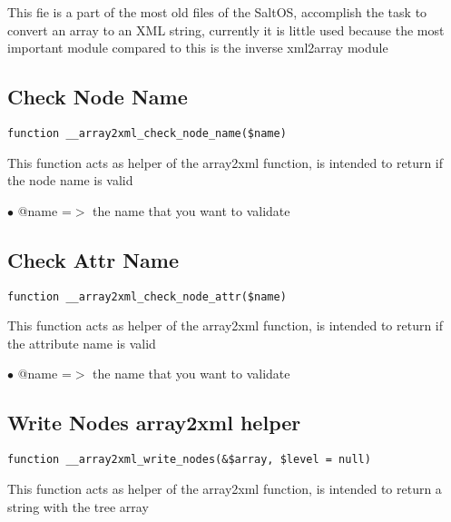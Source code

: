 \documentclass[a4paper]{book}
\begin{document}
This fie is a part of the most old files of the SaltOS, accomplish the task to convert an array
to an XML string, currently it is little used because the most important module compared to this
is the inverse xml2array module

\hypertarget{toc38}{}
\subsection{Check Node Name}

\begin{lstlisting}
function __array2xml_check_node_name($name)
\end{lstlisting}

This function acts as helper of the array2xml function, is intended to
return if the node name is valid

\begin{compactitem}
\item[\color{myblue}$\bullet$] @name =$>$ the name that you want to validate
\end{compactitem}

\hypertarget{toc39}{}
\subsection{Check Attr Name}

\begin{lstlisting}
function __array2xml_check_node_attr($name)
\end{lstlisting}

This function acts as helper of the array2xml function, is intended to
return if the attribute name is valid

\begin{compactitem}
\item[\color{myblue}$\bullet$] @name =$>$ the name that you want to validate
\end{compactitem}

\hypertarget{toc40}{}
\subsection{Write Nodes array2xml helper}

\begin{lstlisting}
function __array2xml_write_nodes(&$array, $level = null)
\end{lstlisting}

This function acts as helper of the array2xml function, is intended to
return a string with the tree array
\end{document}
